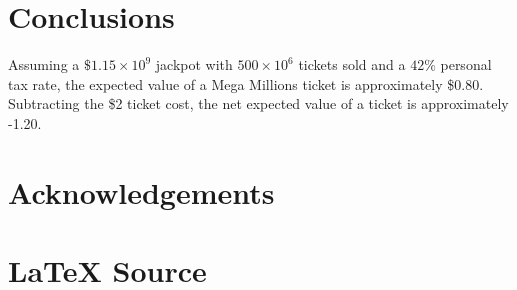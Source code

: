 \documentclass{article}
\theoremstyle{definition}
\begin{document}
\section{Conclusions}
\label{section:conclusions}
Assuming a $\$1.15 \times 10^9$ jackpot with $500 \times 10^6$
tickets sold and a $42\%$ personal tax rate, the expected value
of a Mega Millions ticket is approximately \$0.80. Subtracting the \$2
ticket cost, the net expected value of a ticket is
approximately -1.20.
%
%
%
\section*{Acknowledgements}
\label{section:acknowledgements}
%
%
\section*{\LaTeX \hspace{0.025 mm} Source}
%
%
%


%
%
%
%
%
\end{document}
